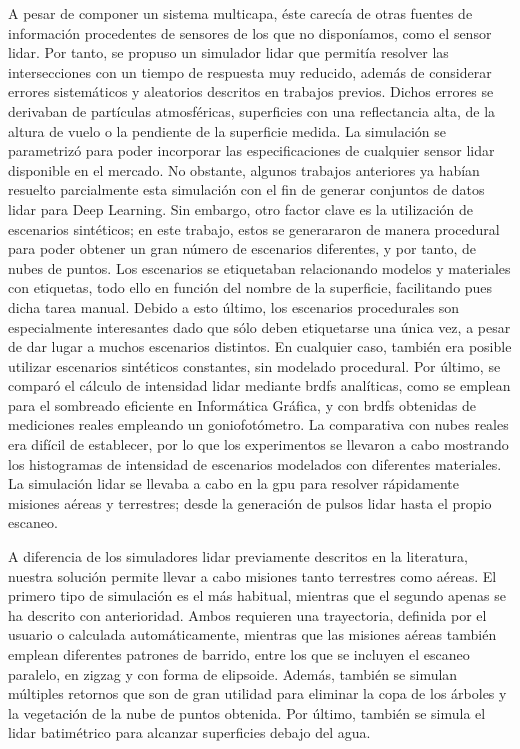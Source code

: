 A pesar de componer un sistema multicapa, éste carecía de otras fuentes de información procedentes de sensores de los que no disponíamos, como el sensor \acrshort{lidar}. Por tanto, se propuso un simulador \acrshort{lidar} que permitía resolver las intersecciones con un tiempo de respuesta muy reducido, además de considerar errores sistemáticos y aleatorios descritos en trabajos previos. Dichos errores se derivaban de partículas atmosféricas, superficies con una reflectancia alta, de la altura de vuelo o la pendiente de la superficie medida. La simulación se parametrizó para poder incorporar las especificaciones de cualquier sensor \acrshort{lidar} disponible en el mercado. No obstante, algunos trabajos anteriores ya habían resuelto parcialmente esta simulación con el fin de generar conjuntos de datos \acrshort{lidar} para Deep Learning. Sin embargo, otro factor clave es la utilización de escenarios sintéticos; en este trabajo, estos se generararon de manera procedural para poder obtener un gran número de escenarios diferentes, y por tanto, de nubes de puntos. Los escenarios se etiquetaban relacionando modelos y materiales con etiquetas, todo ello en función del nombre de la superficie, facilitando pues dicha tarea manual. Debido a esto último, los escenarios procedurales son especialmente interesantes dado que sólo deben etiquetarse una única vez, a pesar de dar lugar a muchos escenarios distintos. En cualquier caso, también era posible utilizar escenarios sintéticos constantes, sin modelado procedural. Por último, se comparó el cálculo de intensidad \acrshort{lidar} mediante \acrshort{brdf}s analíticas, como se emplean para el sombreado eficiente en Informática Gráfica, y con \acrshort{brdf}s obtenidas de mediciones reales empleando un goniofotómetro. La comparativa con nubes reales era difícil de establecer, por lo que los experimentos se llevaron a cabo mostrando los histogramas de intensidad de escenarios modelados con diferentes materiales. La simulación \acrshort{lidar} se llevaba a cabo en la \acrshort{gpu} para resolver rápidamente misiones aéreas y terrestres; desde la generación de pulsos \acrshort{lidar} hasta el propio escaneo.

A diferencia de los simuladores \acrshort{lidar} previamente descritos en la literatura, nuestra solución permite llevar a cabo misiones tanto terrestres como aéreas. El primero tipo de simulación es el más habitual, mientras que el segundo apenas se ha descrito con anterioridad. Ambos requieren una trayectoria, definida por el usuario o calculada automáticamente, mientras que las misiones aéreas también emplean diferentes patrones de barrido, entre los que se incluyen el escaneo paralelo, en zigzag y con forma de elipsoide. Además, también se simulan múltiples retornos que son de gran utilidad para eliminar la copa de los árboles y la vegetación de la nube de puntos obtenida. Por último, también se simula el \acrshort{lidar} batimétrico para alcanzar superficies debajo del agua. 

